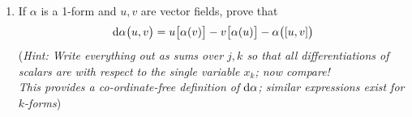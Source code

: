 \begin{exercises}
\begin{enumerate}
\begin{enumerate}
	  \item If $\alpha$ is a 1-form and $u,v$ are vector fields, prove that
	  \[\mathrm{d}\alpha\bigl(u,v\bigr)=u\bigl[\alpha(v)\bigr]-v\bigl[\alpha(u)\bigr]-\alpha\bigl([u,v]\bigl)\]
	  (\emph{Hint: Write everything out as sums over $j,k$ so that all differentiations of scalars are with respect to the single variable $x_k$; now compare!\\	  
	   This provides a co-ordinate-free definition of $\mathrm{d}\alpha$; similar expressions exist for $k$-forms})
	\end{enumerate}
	
	
\end{enumerate}
\end{exercises}

